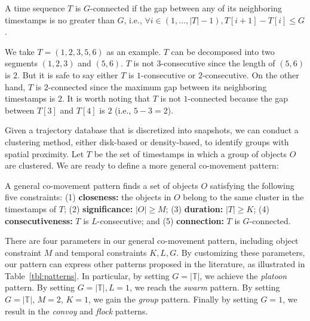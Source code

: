 \begin{definition}[$G$-connected]
A time sequence $T$ is $G$-connected if the gap between any of its neighboring timestamps is no greater than $G$, i.e.,
 $\forall i \in (1,\ldots,|T|-1), T[i+1]-T[i] \leq G$.
\end{definition}

We take $T=(1,2,3,5,6)$ as an example. $T$ can be decomposed into two segments $(1,2,3)$ and $(5,6)$. $T$ is not $3$-consecutive since the length of $(5,6)$ is $2$. But it is safe to say either $T$ is $1$-consecutive or $2$-consecutive. On the other hand, $T$ is $2$-connected since the maximum gap between its neighboring timestamps is $2$. It is worth noting that $T$ is not $1$-connected because the gap between $T[3]$ and $T[4]$ is $2$ (i.e., $5-3=2$).

Given a trajectory database that is discretized into snapshots, we can conduct a clustering method, either disk-based or density-based, to identify groups with spatial proximity. Let $T$ be the set of timestamps in which a group of objects $O$ are clustered. We are ready to define a more general co-movement pattern:
\begin{definition}
A general co-movement pattern finds a set of objects $O$ satisfying the following five constraints: (1) \textbf{closeness:} the objects in $O$ belong to the same cluster in the timestamps of $T$; (2) \textbf{significance:} $|O| \geq M$; (3) \textbf{duration:} $|T| \geq K$; (4) \textbf{consecutiveness:} $T$ is $L$-consecutive; and (5) \textbf{connection:} $T$ is $G$-connected.
\end{definition}
There are four parameters in our general co-movement pattern, including object constraint $M$ and temporal constraints $K,L,G$. 
By customizing these parameters, our pattern can 
express other patterns proposed in the literature, as illustrated in Table~\ref{tbl:patterns}. 
In particular, by setting $G=|\mathbb{T}|$, we achieve the \emph{platoon} pattern. By setting $G=|\mathbb{T}|,L=1$, we reach the \emph{swarm} pattern. By setting $G=|\mathbb{T}|$, $M=2$, $K=1$, we gain the \emph{group} pattern. Finally by setting $G=1$, we result in the \emph{convoy} and \emph{flock} patterns. 
